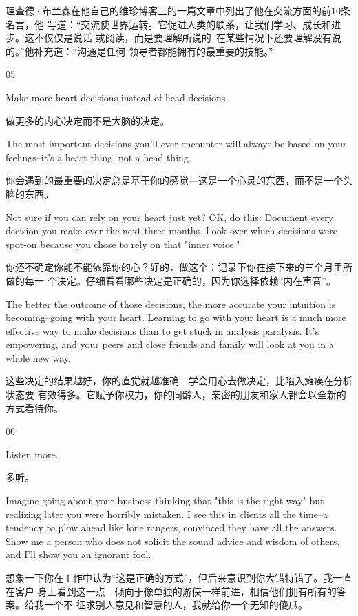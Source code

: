 \documentclass[11pt]{ctexart}
\begin{document}
{{{{理查德·布兰森在他自己的维珍博客上的一篇文章中列出了他在交流方面的前10条名言，他
写道：“交流使世界运转。它促进人类的联系，让我们学习、成长和进步。这不仅仅是说话
或阅读，而是要理解所说的--在某些情况下还要理解没有说的。”他补充道：“沟通是任何
领导者都能拥有的最重要的技能。”

05

Make more heart decisions instead of head decisions.

做更多的内心决定而不是大脑的决定。



The most important decisions you'll ever encounter will always be based on your
feelings--it's a heart thing, not a head thing.

你会遇到的最重要的决定总是基于你的感觉---这是一个心灵的东西，而不是一个头脑的东西。

Not sure if you can rely on your heart just yet? OK, do this: Document every
decision you make over the next three months. Look over which decisions were
spot-on because you chose to rely on that "inner voice."

你还不确定你能不能依靠你的心？好的，做这个：记录下你在接下来的三个月里所做的每一
个决定。仔细看看哪些决定是正确的，因为你选择依赖“内在声音”。

The better the outcome of those decisions, the more accurate your intuition is
becoming--going with your heart. Learning to go with your heart is a much more
effective way to make decisions than to get stuck in analysis paralysis. It's
empowering, and your peers and close friends and family will look at you in a
whole new way.

这些决定的结果越好，你的直觉就越准确---学会用心去做决定，比陷入瘫痪在分析状态要
有效得多。它赋予你权力，你的同龄人，亲密的朋友和家人都会以全新的方式看待你。

06

Listen more.

多听。



Imagine going about your business thinking that "this is the right way" but
realizing later you were horribly mistaken. I see this in clients all the
time--a tendency to plow ahead like lone rangers, convinced they have all the
answers. Show me a person who does not solicit the sound advice and wisdom of
others, and I'll show you an ignorant fool.

想象一下你在工作中认为“这是正确的方式”，但后来意识到你大错特错了。我一直在客户
身上看到这一点---倾向于像单独的游侠一样前进，相信他们拥有所有的答案。给我一个不
征求别人意见和智慧的人，我就给你一个无知的傻瓜。

}}}}
\end{document}
